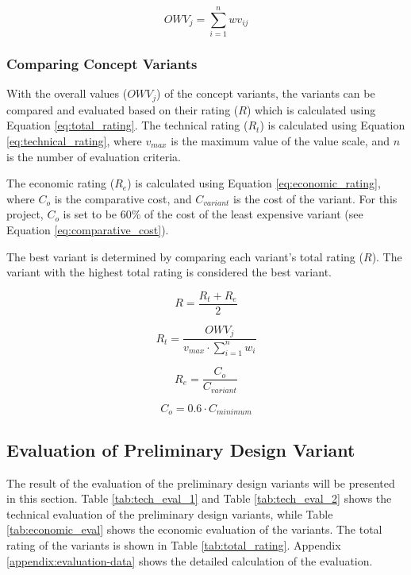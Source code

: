 \begin{equation}
    OWV_{j}=\sum_{i=1}^{n}wv_{ij}
    \label{eq:weighted_sum}
\end{equation}

\subsubsection{Comparing Concept Variants}
With the overall values ($OWV_{j}$) of the concept variants, the variants can be compared and evaluated based on their rating ($R$) which is calculated using Equation \ref{eq:total_rating}. The technical rating ($R_{t}$) is calculated using Equation \ref{eq:technical_rating}, where $v_{max}$ is the maximum value of the value scale, and $n$ is the number of evaluation criteria.

The economic rating ($R_{e}$) is calculated using Equation \ref{eq:economic_rating}, where $C_{o}$ is the comparative cost, and $C_{variant}$ is the cost of the variant. For this project, $C_{o}$ is set to be 60\% of the cost of the least expensive variant (see Equation \ref{eq:comparative_cost}).

The best variant is determined by comparing each variant's total rating ($R$). The variant with the highest total rating is considered the best variant.


\begin{equation}
    R=\frac{R_{t}+R_{e}}{2}
    \label{eq:total_rating}
\end{equation}

\begin{equation}
    R_t=\frac{OWV_{j}}{v_{max}\cdot\sum_{i=1}^{n}w_{i}}
    \label{eq:technical_rating}
\end{equation}

\begin{equation}
    R_e=\frac{C_{o}}{C_{variant}}
    \label{eq:economic_rating}
\end{equation}

\begin{equation}
    C_{o}=0.6\cdot C_{minimum}
    \label{eq:comparative_cost}
\end{equation}

\subsection{Evaluation of Preliminary Design Variant}
The result of the evaluation of the preliminary design variants will be presented in this section. Table \ref{tab:tech_eval_1} and  Table \ref{tab:tech_eval_2} shows the technical evaluation of the preliminary design variants, while Table \ref{tab:economic_eval} shows the economic evaluation of the variants. The total rating of the variants is shown in Table \ref{tab:total_rating}. Appendix \ref{appendix:evaluation-data} shows the detailed calculation of the evaluation.

